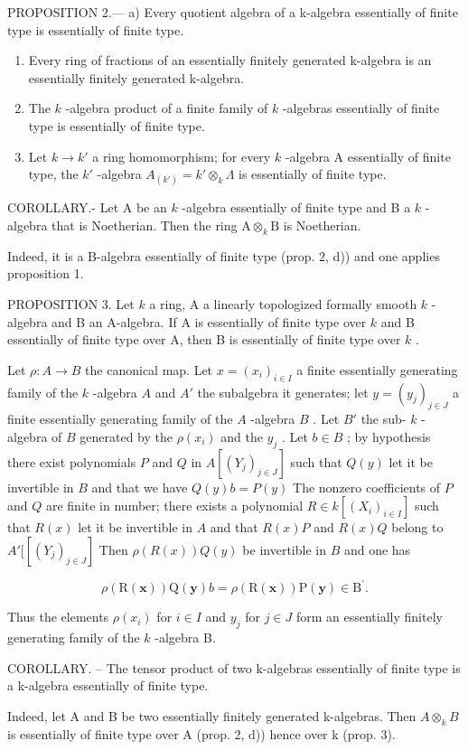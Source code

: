 PROPOSITION 2.--- a) Every quotient algebra of a k-algebra essentially of finite type is essentially of finite type.

\begin{enumerate}
\def\labelenumi{\alph{enumi})}
\setcounter{enumi}{1}
\item
  Every ring of fractions of an essentially finitely generated k-algebra is an essentially finitely generated k-algebra.
\item
  The \(k\) -algebra product of a finite family of \(k\) -algebras essentially of finite type is essentially of finite type.
\item
  Let \(k \to k'\) a ring homomorphism; for every \(k\) -algebra A essentially of finite type, the \(k'\) -algebra \(A_{(k')} = k' \otimes_k \Lambda\) is essentially of finite type.
\end{enumerate}

COROLLARY.- Let A be an \(k\) -algebra essentially of finite type and B a \(k\) -algebra that is Noetherian. Then the ring \(\mathrm{A} \otimes_k \mathrm{B}\) is Noetherian.

Indeed, it is a B-algebra essentially of finite type (prop. 2, d)) and one applies proposition 1.

PROPOSITION 3. Let \(k\) a ring, A a linearly topologized formally smooth \(k\) -algebra and B an A-algebra. If A is essentially of finite type over \(k\) and B essentially of finite type over A, then B is essentially of finite type over \(k\) .

Let \(\rho: A \to B\) the canonical map. Let \(x = (x_i)_{i \in I}\) a finite essentially generating family of the \(k\) -algebra \(A\) and \(A'\) the subalgebra it generates; let \(y = (y_j)_{j \in J}\) a finite essentially generating family of the \(A\) -algebra \(B\) . Let \(B'\) the sub- \(k\) -algebra of \(B\) generated by the \(\rho(x_i)\) and the \(y_j\) . Let \(b \in B\) ; by hypothesis there exist polynomials \(P\) and \(Q\) in \(A[(Y_j)_{j \in J}]\) such that \(Q(y)\) let it be invertible in \(B\) and that we have \(Q(y)b = P(y)\) The nonzero coefficients of \(P\) and \(Q\) are finite in number; there exists a polynomial \(R \in k[(X_i)_{i \in I}]\) such that \(R(x)\) let it be invertible in \(A\) and that \(R(x)P\) and \(R(x)Q\) belong to \(A'[[(Y_j)_{j \in J}]\) Then \(\rho(R(x))Q(y)\) be invertible in \(B\) and one has

\[
\rho (\mathrm{R} (\mathbf {x})) \mathrm{Q} (\mathbf {y}) b = \rho (\mathrm{R} (\mathbf {x})) \mathrm{P} (\mathbf {y}) \in \mathrm{B} ^ {\prime}.
\]

Thus the elements \(\rho(x_i)\) for \(i \in I\) and \(y_j\) for \(j \in J\) form an essentially finitely generating family of the \(k\) -algebra B.

COROLLARY. -- The tensor product of two k-algebras essentially of finite type is a k-algebra essentially of finite type.

Indeed, let A and B be two essentially finitely generated k-algebras. Then \(A \otimes_{k} B\) is essentially of finite type over A (prop. 2, d)) hence over k (prop. 3).

